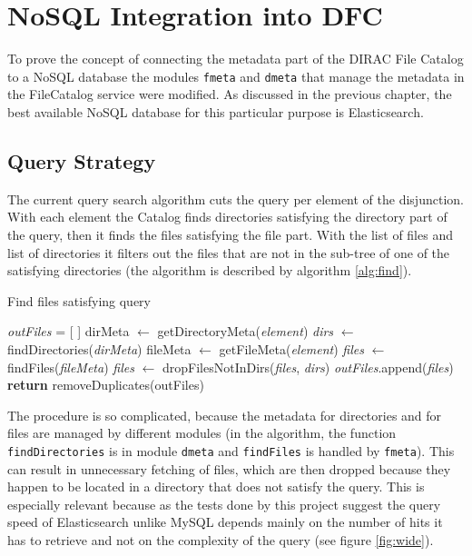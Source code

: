 \chapter{NoSQL Integration into DFC}
\label{chap:NoSQL}

To prove the concept of connecting the metadata part of the DIRAC File Catalog to a NoSQL database the 
modules \texttt{fmeta} and \texttt{dmeta} that manage the metadata in the FileCatalog service were modified.
As discussed in the previous chapter, the best available NoSQL database for this particular purpose is 
Elasticsearch. 

\section{Query Strategy}
The current query search algorithm cuts the query per element of the disjunction. With each element the Catalog
finds directories satisfying the directory part of the query, then it finds the files satisfying the file part. 
With the list of files and list of directories it filters out the files that are not in the sub-tree of one of the
satisfying directories (the algorithm is described by algorithm \ref{alg:find}).

\begin{algorithm}[h]
\caption{Find files satisfying query}
\label{alg:find}
\begin{algorithmic}[1]
	\State \textit{outFiles} = [  ]
		\State dirMeta $\leftarrow$ getDirectoryMeta(\textit{element})
		\State \textit{dirs} $\leftarrow$ findDirectories(\textit{dirMeta}) 
		\State fileMeta $\leftarrow$ getFileMeta(\textit{element})
		\State \textit{files} $\leftarrow$ findFiles(\textit{fileMeta})
		\State \textit{files} $\leftarrow$ dropFilesNotInDirs(\textit{files}, \textit{dirs})
		\State \textit{outFiles}.append(\textit{files})
	\EndFor
	\State \textbf{return} removeDuplicates(outFiles)
\EndFunction
\end{algorithmic}
\end{algorithm}

The procedure is so complicated, because the metadata for directories and for files are managed by different 
modules (in the algorithm, the function \texttt{findDirectories} is in module \texttt{dmeta} and \texttt{findFiles} 
is handled by \texttt{fmeta}). This can result in unnecessary fetching of files, which are then dropped because
they happen to be located in a directory that does not satisfy the query. This is especially relevant because as
the tests done by this project suggest the query speed of Elasticsearch unlike MySQL depends mainly on the
number of hits it has to retrieve and
not on the complexity of the query (see figure \ref{fig:wide}). 

